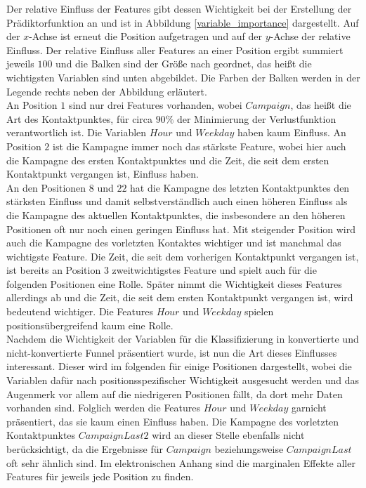 \noindent Der relative Einfluss der Features gibt dessen Wichtigkeit bei der Erstellung der Prädiktorfunktion an und ist in Abbildung \ref{variable_importance} dargestellt. Auf der $x$-Achse ist erneut die Position aufgetragen und auf der $y$-Achse der relative Einfluss. Der relative Einfluss aller Features an einer Position ergibt summiert jeweils $100$ und die Balken sind der Größe nach geordnet, das heißt die wichtigsten Variablen sind unten abgebildet. Die Farben der Balken werden in der Legende rechts neben der Abbildung erläutert.\\
An Position $1$ sind nur drei Features vorhanden, wobei $Campaign$, das heißt die Art des Kontaktpunktes, für circa $90 \%$ der Minimierung der Verlustfunktion verantwortlich ist. Die Variablen $Hour$ und $Weekday$ haben kaum Einfluss. An Position $2$ ist die Kampagne immer noch das stärkste Feature, wobei hier auch die Kampagne des ersten Kontaktpunktes und die Zeit, die seit dem ersten Kontaktpunkt vergangen ist, Einfluss haben.\\
An den Positionen $8$ und $22$ hat die Kampagne des letzten Kontaktpunktes den stärksten Einfluss und damit selbstverständlich auch einen höheren Einfluss als die Kampagne des aktuellen Kontaktpunktes, die insbesondere an den höheren Positionen oft nur noch einen geringen Einfluss hat. Mit steigender Position wird auch die Kampagne des vorletzten Kontaktes wichtiger und ist manchmal das wichtigste Feature. Die Zeit, die seit dem vorherigen Kontaktpunkt vergangen ist, ist bereits an Position $3$ zweitwichtigstes Feature und spielt auch für die folgenden Positionen eine Rolle. Später nimmt die Wichtigkeit dieses Features allerdings ab und die Zeit, die seit dem ersten Kontaktpunkt vergangen ist, wird bedeutend wichtiger. Die Features $Hour$ und $Weekday$ spielen positionsübergreifend kaum eine Rolle.\\
Nachdem die Wichtigkeit der Variablen für die Klassifizierung in konvertierte und nicht-konvertierte Funnel präsentiert wurde, ist nun die Art dieses Einflusses interessant. Dieser wird im folgenden für einige Positionen dargestellt, wobei die Variablen dafür nach positionsspezifischer Wichtigkeit ausgesucht werden und das Augenmerk vor allem auf die niedrigeren Positionen fällt, da dort mehr Daten vorhanden sind. Folglich werden die Features $Hour$ und $Weekday$ garnicht präsentiert, das sie kaum einen Einfluss haben. Die Kampagne des vorletzten Kontaktpunktes $CampaignLast2$ wird an dieser Stelle ebenfalls nicht berücksichtigt, da die Ergebnisse für $Campaign$ beziehungsweise $CampaignLast$ oft sehr ähnlich sind. Im elektronischen Anhang sind die marginalen Effekte aller Features für jeweils jede Position zu finden.
